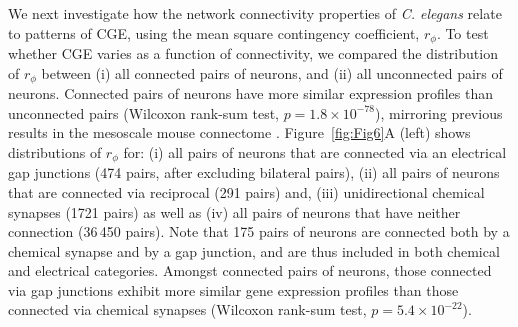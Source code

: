 \documentclass[10pt,letterpaper]{article}
\begin{document}
We next investigate how the network connectivity properties of \emph{C. elegans} relate to patterns of CGE, using the mean square contingency coefficient, $r_\phi$.
To test whether CGE varies as a function of connectivity, we compared the distribution of $r_\phi$ between
(i) all connected pairs of neurons, and
(ii) all unconnected pairs of neurons.
Connected pairs of neurons have more similar expression profiles than unconnected pairs (Wilcoxon rank-sum test, $p = 1.8 \times 10^{-78}$), mirroring previous results in the mesoscale mouse connectome \cite{Fulcher:2016ck}.
Figure~\ref{fig:Fig6}A (left) shows distributions of $r_\phi$ for:
(i) all pairs of neurons that are connected via an electrical gap junctions (474 pairs, after excluding bilateral pairs),
(ii) all pairs of neurons that are connected via reciprocal (291 pairs) and,
(iii) unidirectional chemical synapses (1721 pairs) as well as
(iv) all pairs of neurons that have neither connection (36\,450 pairs).
Note that 175 pairs of neurons are connected both by a chemical synapse and by a gap junction, and are thus included in both chemical and electrical categories.
Amongst connected pairs of neurons, those connected via gap junctions exhibit more similar gene expression profiles than those connected via chemical synapses (Wilcoxon rank-sum test, $p = 5.4 \times 10^{-22}$).
\end{document}
